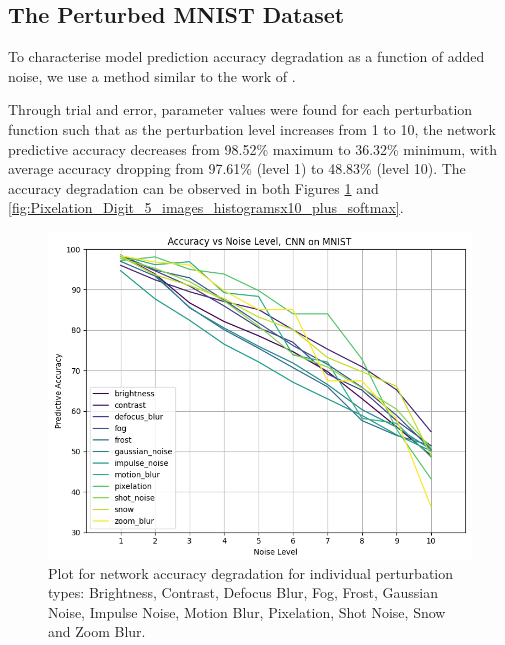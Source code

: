 \subsection{The Perturbed MNIST Dataset}

To characterise model prediction accuracy degradation as a function of added noise, we use a method similar to the work of \cite{hendrycks2019benchmarking}.

Through trial and error, parameter values were found for each perturbation function such that as the perturbation level increases from 1 to 10, the network predictive accuracy decreases from 98.52\% maximum to 36.32\% minimum, with average accuracy dropping from 97.61\% (level 1) to 48.83\% (level 10). The accuracy degradation can be observed in both Figures \ref{fig:Accuracy_vs_Noise_types} and \ref{fig:Pixelation_Digit_5_images_histogramsx10_plus_softmax}.

\begin{figure}[h!] 
\begin{center}
\includegraphics[width=0.99\columnwidth]{Figures/Results/Figures_accuracy_vs_noise_types_plot.png}
\end{center}
\caption{Plot for network accuracy degradation for individual perturbation types: Brightness, Contrast, Defocus Blur, Fog, Frost, Gaussian Noise, Impulse Noise, Motion Blur, Pixelation, Shot Noise, Snow and Zoom Blur.}
\label{fig:Accuracy_vs_Noise_types}
\end{figure}

